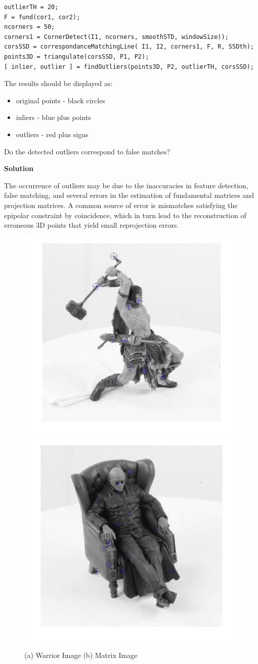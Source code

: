 \documentclass{assignment}
\begin{document}
\begin{problemlist}
\begin{enumerate}[label*=\arabic*.]
\begin{verbatim}
outlierTH = 20;
F = fund(cor1, cor2);
ncorners = 50;
corners1 = CornerDetect(I1, ncorners, smoothSTD, windowSize));
corsSSD = correspondanceMatchingLine( I1, I2, corners1, F, R, SSDth);
points3D = triangulate(corsSSD, P1, P2);
[ inlier, outlier ] = findOutliers(points3D, P2, outlierTH, corsSSD);
\end{verbatim}

The results should be displayed as:

\begin{itemize}

\item original points - black circles

\item inliers - blue plus points

\item outliers - red plus signs

\end{itemize}

Do the detected outliers correspond to false matches?

\textbf{Solution}

The occurrence of outliers may be due to the inaccuracies in feature detection, false matching, and several errors in the estimation of fundamental matrices and projection matrices. A common source of error is mismatches satisfying the epipolar constraint by coincidence, which in turn lead to the reconstruction of erroneous 3D points that yield small reprojection errors.

\begin{figure}[H]
\centering
\includegraphics[width=0.45\columnwidth]{6_6_warrior}
\includegraphics[width=0.45\columnwidth]{6_6_matrix} 
\caption{(a) Warrior Image (b) Matrix Image}
\label{fig:i6_5}
\end{figure}

\end{enumerate}

\end{problemlist}
\end{document}

